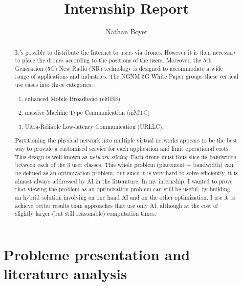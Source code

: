 \documentclass[letterpaper]{article}
\title{Internship Report}
\author{Nathan Boyer}
\begin{document}
\maketitle

\begin{abstract}

    It's possible to distribute the Internet to users via drones.
    However it is then necessary to place the drones according to the positions of the users.
    Moreover, the 5th Generation (5G) New Radio (NR) technology is designed to accommodate a wide range of applications and industries. The NGNM 5G White Paper \cite{5gwhitepaper} groups these vertical use cases into three categories:
    \begin{enumerate}
        \item enhanced Mobile Broadband (eMBB)
        \item massive Machine Type Communication (mMTC)
        \item Ultra-Reliable Low-latency Communication (URLLC).
    \end{enumerate}

    Partitioning the physical network into multiple virtual networks appears to be the best way to provide a customised service for each application and limit operational costs. This design is well known as \textit{network slicing}.
    Each drone must thus slice its bandwidth between each of the 3 user classes.
    This whole problem (placement + bandwidth) can be defined as an optimization problem, but since it is very hard to solve efficiently, it is almost always addressed by AI in the litterature.
    In my internship, I wanted to prove that viewing the problem as an optimization problem can still be useful, by building an hybrid solution involving on one hand AI and on the other optimization.
    I use it to achieve better results than approaches that use only AI, although at the cost of slightly larger (but still reasonable) computation times.
\end{abstract}


\tableofcontents


\section{Probleme presentation and literature analysis}
\end{document}

